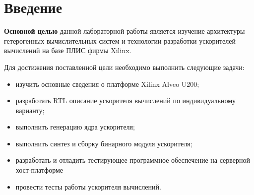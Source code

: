 \chapter*{Введение}

\textbf{Основной целью} данной лабораторной работы является изучение архитектуры гетерогенных вычислительных систем и технологии разработки ускорителей вычислений на базе ПЛИС фирмы Xilinx.

Для достижения поставленной цели необходимо выполнить следующие задачи:
\begin{itemize}
	\item изучить основные сведения о платформе Xilinx Alveo U200;
	\item разработать RTL описание ускорителя вычислений по индивидуальному варианту;
	\item выполнить генерацию ядра ускорителя;
	\item выполнить синтез и сборку бинарного модуля ускорителя;
	\item разработать и отладить тестирующее программное обеспечение на серверной хост-платформе
	\item провести тесты работы ускорителя вычислений.
\end{itemize}
